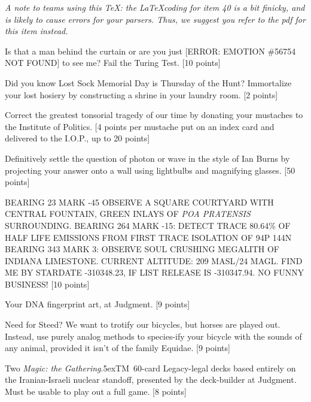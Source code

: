 \documentclass{book}
\def\tm{\raise.5ex\hbox{\scriptsize TM}}
\begin{document}
\begin{list}{}{}
\newpage




\item \emph{A note to teams using this TeX: the \LaTeX coding for item 40 is a bit finicky, and is likely to cause errors for your parsers. Thus, we suggest you refer to the pdf for this item instead.}

\item Is that a man behind the curtain or are you just [ERROR: EMOTION \#56754 NOT FOUND] to see me?  Fail the Turing Test.	[10 points]

\item Did you know Lost Sock Memorial Day is Thursday of the Hunt?  Immortalize your lost hosiery by constructing a shrine in your laundry room. [2 points]

\item Correct the greatest tonsorial tragedy of our time by donating your mustaches to the Institute of Politics. [4 points per mustache put on an index card and delivered to the I.O.P., up to 20 points]

\item Definitively settle the question of photon or wave in the style of Ian Burns by projecting your answer onto a wall using lightbulbs and magnifying glasses. [50 points]

\item 
BEARING 23 MARK -45
OBSERVE A SQUARE COURTYARD WITH CENTRAL FOUNTAIN,
GREEN INLAYS OF \emph{POA PRATENSIS} SURROUNDING. BEARING 264 MARK -15: DETECT
TRACE 80.64\% OF HALF LIFE EMISSIONS FROM FIRST TRACE ISOLATION OF 94P 144N
BEARING 343 MARK 3: OBSERVE SOUL CRUSHING MEGALITH OF INDIANA LIMESTONE.
CURRENT ALTITUDE: 209 MASL/24 MAGL. FIND ME BY STARDATE -310348.23, IF LIST
RELEASE IS -310347.94. NO FUNNY BUSINESS! [10 points]

\item Your DNA fingerprint art, at Judgment. [9 points]

\item Need for Steed? We want to trotify our bicycles, but horses are played out. Instead, use purely analog methods to species-ify your bicycle with the sounds of any animal, provided it isn't of the family Equidae.  [9 points]

\item \label{magic} Two \emph{Magic: the Gathering}\tm\ 60-card Legacy-legal decks based entirely on the Iranian-Israeli nuclear standoff, presented by the deck-builder at Judgment.  Must be usable to play out a full game. [8 points]


\end{list}
\end{document}
